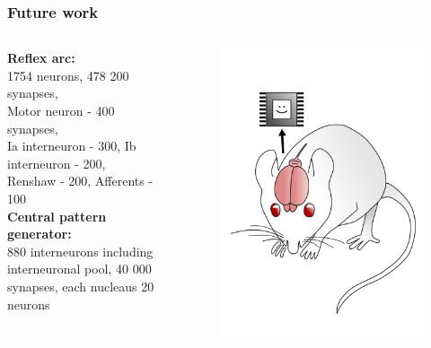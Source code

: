 \documentclass[12pt, aspectratio=169]{beamer}
\begin{document}
\begin{frame}
  \frametitle{Future work}
\begin{columns}[c]

\textbf{Reflex arc:}\\
1754 neurons, 478 200 synapses,\\
Motor neuron - 400 synapses,\\
Ia interneuron - 300,
Ib interneuron - 200,\\
Renshaw - 200,
Afferents - 100\\

\textbf{Central pattern generator:}\\
880 interneurons including interneuronal pool,
40 000 synapses,
each nucleaus 20 neurons

\begin{figure}
\includegraphics[width=1.0\linewidth]{mousebrainpink}
\end{figure}
\end{columns}
\end{frame}
\end{document}
